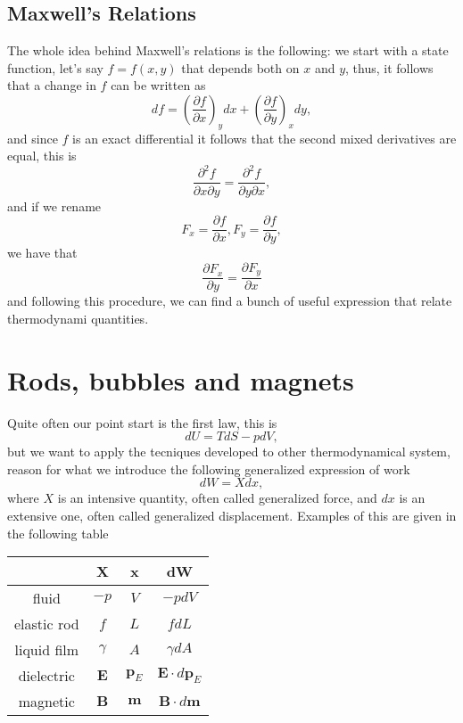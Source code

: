 \documentclass{article}
\begin{document}
\subsection{Maxwell's Relations}
The whole idea behind Maxwell's relations is the following: we start with a state function, let's say $f=f(x,y)$ that depends both on $x$ and $y$, thus, it follows that a change in $f$ can be written as 
\begin{displaymath}
  df = \left(\frac{\partial f}{\partial x}\right)_{y}dx + \left(\frac{\partial f}{\partial y}\right)_{x}dy,
\end{displaymath}
and since $f$ is an exact differential it follows that the second mixed derivatives are equal, this is 
\begin{displaymath}
  \frac{\partial^2 f}{\partial x\partial y} = \frac{\partial^2 f}{\partial y\partial x},
\end{displaymath}
and if we rename
\begin{displaymath}
  F_{x} = \frac{\partial f}{\partial x}, F_{y} = \frac{\partial f}{\partial y},
\end{displaymath}
we have that 
\begin{displaymath}
	\frac{\partial F_x}{\partial y} = \frac{\partial F_y}{\partial x}  
\end{displaymath}
and following this procedure, we can find a bunch of useful expression that relate thermodynami quantities.

\section{Rods, bubbles and magnets}
Quite often our point start is the first law, this is
\begin{displaymath}
  dU = TdS- pdV,
\end{displaymath}
but we want to apply the tecniques developed to other thermodynamical system, reason for what we introduce the following generalized expression of work
\begin{displaymath}
  dW = Xdx,
\end{displaymath}
where $X$ is an intensive quantity, often called generalized force, and $dx$ is an extensive one, often called generalized displacement.
Examples of this are given in the following table
\begin{center}
\begin{tabular}{ |c|c|c|c| } 
 \hline
  & X & x & dW \\
 \hline\hline
 fluid        & $-p$ & $V$ & $-pdV$ \\ 
 elastic rod  & $f$  & $L$ & $fdL$ \\ 
 liquid film  & $\gamma$ & $A$ & $\gamma dA$ \\ 
 dielectric   & $\mathbf{E}$ & $\mathbf{p}_E$ & $\mathbf{E}\cdot d\mathbf{p}_E$ \\
 magnetic     & $\mathbf{B}$ & $\mathbf{m}$   & $\mathbf{B}\cdot d\mathbf{m}$\\
 \hline
\end{tabular}
\end{center}
\end{document}
